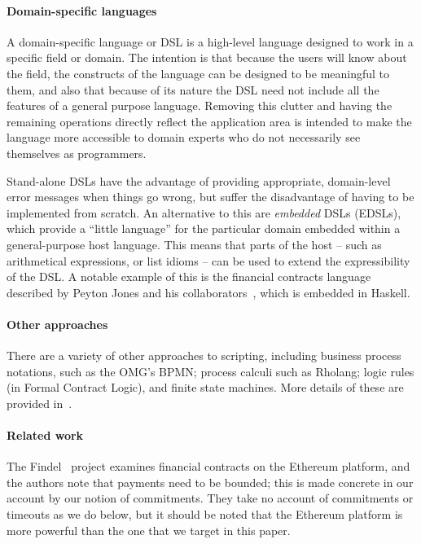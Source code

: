 \documentclass[
      acmsmall
    , screen
    , review=true
  ]{acmart}
\begin{document}
\paragraph{Domain-specific languages} 

A domain-specific language or DSL is a high-level language designed to work in a specific field or domain. The intention is that because the users will know about the field, the constructs of the language can be designed to be meaningful to them, and also that because of its nature the DSL need not include all the features of a general purpose language. Removing this clutter and having the remaining operations directly reflect the application area is intended to make the language more accessible to domain experts who do not necessarily see themselves as programmers.

Stand-alone DSLs have the advantage of providing appropriate, domain-level error messages when things go wrong, but suffer the disadvantage of having to be implemented from scratch. An alternative to this are \emph{embedded} DSLs (EDSLs), which provide a ``little language'' for the particular domain embedded within a general-purpose host language. This means that parts of the host -- such as arithmetical expressions, or list idioms --  can be used to extend the expressibility of the DSL. A notable example of this is the financial contracts language described by Peyton Jones and his collaborators~\cite{PeytonJones:2000}, which is embedded in Haskell.

\paragraph{Other approaches}

There are a variety of other approaches to scripting, including business process notations, such as the OMG's BPMN; process calculi such as Rholang; logic rules (in Formal Contract Logic), and finite state machines. More details of these are provided in~\cite{cryptoeprint:2016:1156}.

\paragraph{Related work}

The Findel~\cite{findel} project examines financial contracts on the Ethereum platform, and the authors note that  payments need to be bounded; this is made concrete in our account by our notion of commitments. They take no account of commitments or timeouts as we do below, but it should be noted that the Ethereum platform is more powerful than the one that we target in this paper.
\end{document}
